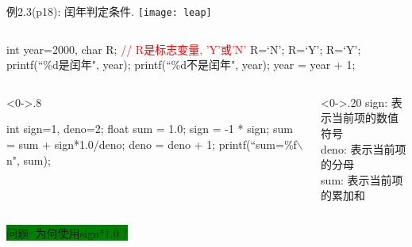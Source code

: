 \begin{frame}{例2.3(p18): 闰年判定条件.}
\centering
\texttt{[image: leap]}
\end{frame}


\begin{frame}[shrink]
\begin{columns}%
\begin{column}{1.0\textwidth}
\begin{algorithm}[H]  
\caption{例2.3(p18): 判定2000—2500年中的每一年是否为闰年.} %
\begin{algorithmic}[1] %
\State int year=2000, char R; \textcolor{red}{// R是标志变量, 'Y'或'N'}
\State R=`N';  
 R=`Y'; %
 R=`Y';
\EndIf
{} printf(``\%d是闰年", year); 
\Else \quad printf(``\%d不是闰年", year);
\EndIf	
\State year = year + 1;
\EndWhile
\end{algorithmic}  
\end{algorithm}
\end{column}%
\end{columns}


\begin{frame}%
\begin{columns}%
\begin{column}<0->{.8\textwidth}
\begin{algorithm}[H]  
\caption{例2.4(p19): 求$1-\frac{1}{2}+\frac{1}{3}-\frac{1}{4}+\cdots+\frac{1}{99}-\frac{1}{100}$.} %
\begin{algorithmic}[1] %
\State int sign=1, deno=2;
\State float sum = 1.0; 
\State sign = -1 * sign;
\State sum = sum + sign*1.0/deno; 
\State deno = deno + 1; 
\EndWhile
\State printf(``sum=\%f$\backslash$n", sum);	
\end{algorithmic}  
\end{algorithm}
\end{column}%
\begin{column}<0->{.20\textwidth}
\newline
\newline
sign: 表示当前项的数值符号\\
deno: 表示当前项的分母\\
sum:  表示当前项的累加和
\end{column}%
\end{columns}
\medskip
\colorbox{green}{问题: 为何使用sign*1.0 ?}
\end{frame}


\end{frame}
